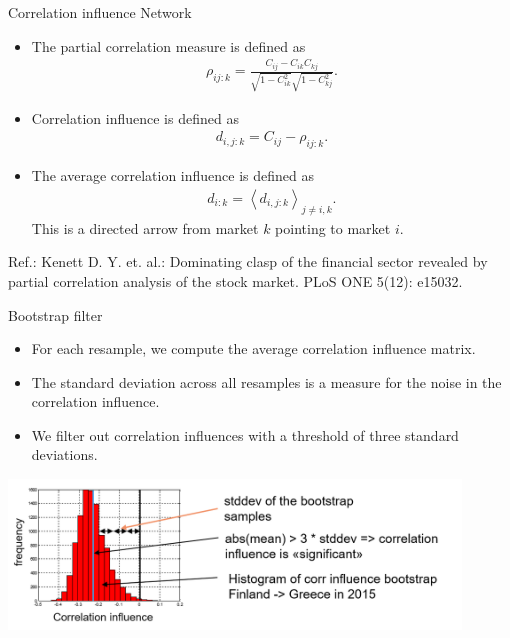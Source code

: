 \documentclass{beamer}
\newcommand{\avg}[1]{\left< #1 \right>} %
\begin{document}
\begin{frame}{Correlation influence Network}
\begin{itemize}
  \item The partial correlation measure is defined as
 \begin{eqnarray}
\rho_{ij:k} = \frac{C_{ij} - C_{ik}C_{kj}}{\sqrt{1-C_{ik}^2} \sqrt{1-C_{kj}^2}}.
\label{partial_correlation}
\end{eqnarray}

  \item  Correlation influence is defined as
\begin{eqnarray}
d_{i,j:k}=C_{ij}-\rho_{ij:k}.
\end{eqnarray}

\item The average correlation influence is defined as
\begin{eqnarray}
d_{i:k}=\avg{d_{i,j:k}}_{j \neq i,k}.
\label{d_ik}
\end{eqnarray}
This is a directed arrow from market $k$ pointing to market $i$.
\end{itemize}

Ref.: Kenett D. Y. et. al.: Dominating clasp of the financial sector revealed by partial correlation analysis of the stock market. PLoS ONE 5(12): e15032. 

\end{frame}


\begin{frame}{Bootstrap filter}
\begin{itemize}
\item For each resample, we compute the average correlation influence matrix.  
\item The standard deviation across all resamples is a measure for the noise in the correlation influence.
\item We filter out correlation influences with a threshold of three standard deviations.

\end{itemize}


\includegraphics[width=12cm]{bootstrap}

\end{frame}
\end{document}
